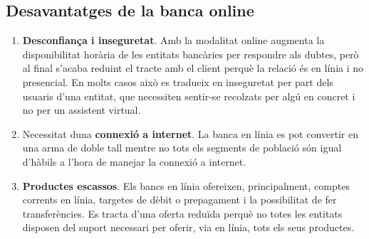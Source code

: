 \subsection*{Desavantatges de la banca online}

\begin{enumerate}
    \item \textbf{Desconfiança i inseguretat}. Amb la modalitat online augmenta la disponibilitat horària de les entitats bancàries per respondre als dubtes, però al final s'acaba reduint el tracte amb el client perquè la relació és en línia i no presencial. En molts casos això es tradueix en inseguretat per part dels usuaris d'una entitat, que necessiten sentir-se recolzats per algú en concret i no per un assistent virtual.
    \item Necessitat duna \textbf{connexió a internet}. La banca en línia es pot convertir en una arma de doble tall mentre no tots els segments de població són igual d'hàbils a l'hora de manejar la connexió a internet.
    \item \textbf{Productes escassos}. Els bancs en línia ofereixen, principalment, comptes corrents en línia, targetes de dèbit o prepagament i la possibilitat de fer transferències. Es tracta d'una oferta reduïda perquè no totes les entitats disposen del suport necessari per oferir, via en línia, tots els seus productes.
\end{enumerate}

